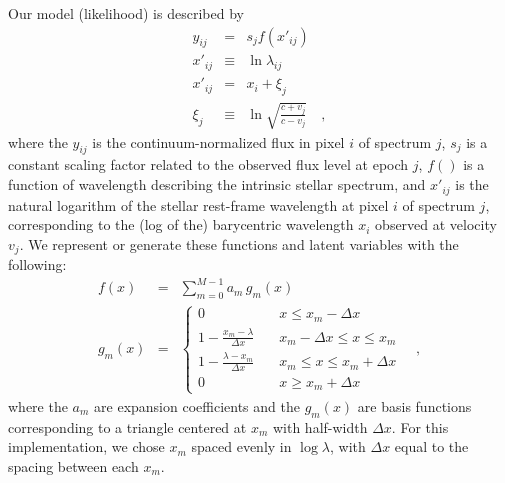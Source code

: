 \documentclass[12pt, letterpaper]{article}
\newcommand{\given}{\,|\,}
\newcommand{\normal}{{\mathcal{N}}}
\begin{document}
Our model (likelihood) is described by
\begin{eqnarray}
   y_{ij} &=& s_j f(x'_{ij})
  \\
  x'_{ij} &\equiv& \ln \lambda_{ij}
  \\
  x'_{ij} &=& x_i + \xi_j
  \\
  \xi_j &\equiv& \ln \sqrt{\frac{c + v_j}{c - v_j}}
  \quad , 
\end{eqnarray}
where the $y_{ij}$ is the continuum-normalized flux in pixel $i$ of
spectrum $j$, $s_j$ is a constant scaling factor related to the observed
flux level at epoch $j$, $f()$ is a function of
wavelength describing the intrinsic stellar spectrum, and
$x'_{ij}$ is the natural logarithm of the stellar rest-frame wavelength
at pixel $i$ of spectrum $j$, 
corresponding to the (log of the) barycentric wavelength $x_i$ observed at
velocity $v_j$.
We represent or generate these functions and latent variables
with the following:
\begin{eqnarray}
  f(x) &=& \sum_{m=0}^{M-1} a_m\,g_m(x)
  \\
  g_m(x) &=& \left\{
        \begin{array}{ll}
            0 & \quad x \leq x_m -\Delta x \\
            1 - \frac{x_m - \lambda}{\Delta x} & \quad x_m - \Delta x \leq x \leq x_m \\
            1 - \frac{\lambda - x_m}{\Delta x} & \quad x_m \leq x \leq x_m + \Delta x \\
            0 & \quad x \geq x_m + \Delta x \label{eqn:triangle}
        \end{array}
    \right.
  \quad ,
\end{eqnarray}
where the $a_m$ are expansion coefficients and the $g_m(x)$
are basis functions corresponding to a triangle centered at $x_m$ with half-width 
$\Delta x$. For this implementation, we chose $x_m$ spaced evenly in $\log \lambda$, 
with $\Delta x$ equal to the spacing between each $x_m$.
\end{document}
